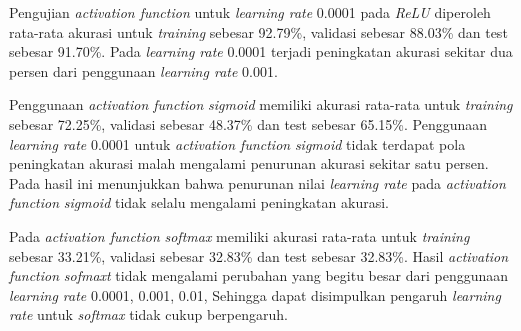     Pengujian \textit{activation function} untuk \textit{learning rate} 0.0001 
    pada \textit{ReLU} diperoleh rata-rata akurasi untuk \textit{training} sebesar 92.79\%, validasi sebesar 88.03\% dan test sebesar 91.70\%. Pada \textit{learning rate} 0.0001 terjadi peningkatan akurasi sekitar dua persen dari penggunaan \textit{learning rate} 0.001. 
    
    Penggunaan \textit{activation function} \textit{sigmoid} memiliki akurasi rata-rata untuk \textit{training} sebesar 72.25\%, validasi sebesar 48.37\% dan test sebesar 65.15\%. Penggunaan \textit{learning rate} 0.0001 untuk \textit{activation function} \textit{sigmoid} tidak terdapat pola peningkatan akurasi malah mengalami penurunan akurasi sekitar satu persen. Pada hasil ini menunjukkan bahwa penurunan nilai \textit{learning rate} pada \textit{activation function} \textit{sigmoid}
    tidak selalu mengalami peningkatan akurasi. 

    Pada \textit{activation function} \textit{softmax} memiliki akurasi rata-rata untuk \textit{training} sebesar 33.21\%, validasi sebesar 32.83\% dan test sebesar 32.83\%. Hasil \textit{activation function} \textit{sofmaxt} tidak mengalami perubahan yang begitu besar dari penggunaan \textit{learning rate} 0.0001, 0.001, 0.01, Sehingga dapat disimpulkan pengaruh \textit{learning rate} untuk \textit{softmax }tidak cukup berpengaruh.



